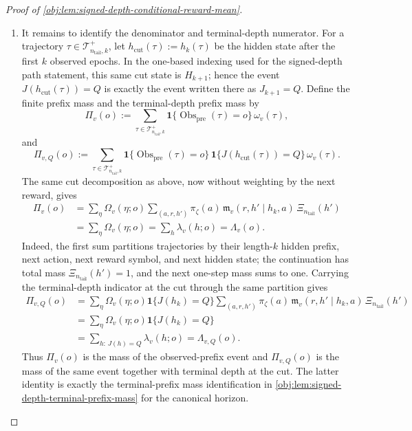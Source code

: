 \begin{proof}[Proof of \cref{obj:lem:signed-depth-conditional-reward-mean}]
\begin{enumerate}
\item
It remains to identify the denominator and terminal-depth numerator. For a trajectory \(\tau\in\mathcal T^+_{n_{\mathrm{tail}},k}\), let \(h_{\mathrm{cut}}(\tau):=h_k(\tau)\) be the hidden state after the first \(k\) observed epochs. In the one-based indexing used for the signed-depth path statement, this same cut state is \(H_{k+1}\); hence the event \(J(h_{\mathrm{cut}}(\tau))=Q\) is exactly the event written there as \(J_{k+1}=Q\). Define the finite prefix mass and the terminal-depth prefix mass by
\[
\Pi_v(o)
:=
\sum_{\tau\in\mathcal T^+_{n_{\mathrm{tail}},k}}
\mathbf 1\{\operatorname{Obs}_{\mathrm{pre}}(\tau)=o\}\,\omega_v(\tau),
\]
and
\[
\Pi_{v,Q}(o)
:=
\sum_{\tau\in\mathcal T^+_{n_{\mathrm{tail}},k}}
\mathbf 1\{\operatorname{Obs}_{\mathrm{pre}}(\tau)=o\}\,
\mathbf 1\{J(h_{\mathrm{cut}}(\tau))=Q\}\,\omega_v(\tau).
\]
The same cut decomposition as above, now without weighting by the next reward, gives
\[
\begin{aligned}
\Pi_v(o)
&=
\sum_{\eta}\Omega_v(\eta;o)
\sum_{(a,r,h')}\pi_\zeta(a)\,
\mathfrak m_v(r,h'\mid h_k,a)\,\Xi_{n_{\mathrm{tail}}}(h') \\
&=
\sum_{\eta}\Omega_v(\eta;o)
=
\sum_h\lambda_v(h;o)
=
\Lambda_v(o).
\end{aligned}
\]
Indeed, the first sum partitions trajectories by their length-\(k\) hidden prefix, next action, next reward symbol, and next hidden state; the continuation has total mass \(\Xi_{n_{\mathrm{tail}}}(h')=1\), and the next one-step mass sums to one. Carrying the terminal-depth indicator at the cut through the same partition gives
\[
\begin{aligned}
\Pi_{v,Q}(o)
&=
\sum_{\eta}\Omega_v(\eta;o)\mathbf 1\{J(h_k)=Q\}
\sum_{(a,r,h')}\pi_\zeta(a)\,
\mathfrak m_v(r,h'\mid h_k,a)\,\Xi_{n_{\mathrm{tail}}}(h') \\
&=
\sum_{\eta}\Omega_v(\eta;o)\mathbf 1\{J(h_k)=Q\} \\
&=
\sum_{h:\,J(h)=Q}\lambda_v(h;o)
=
\Lambda_{v,Q}(o).
\end{aligned}
\]
Thus \(\Pi_v(o)\) is the mass of the observed-prefix event and \(\Pi_{v,Q}(o)\) is the mass of the same event together with terminal depth at the cut. The latter identity is exactly the terminal-prefix mass identification in \cref{obj:lem:signed-depth-terminal-prefix-mass} for the canonical horizon.


\end{enumerate}
\end{proof}

